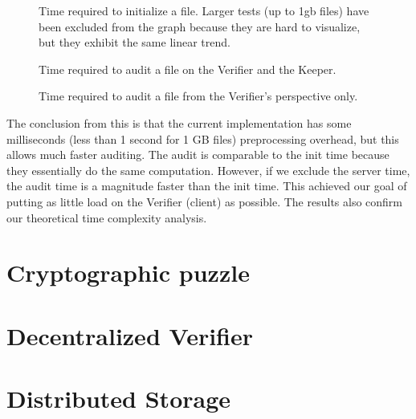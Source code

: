 \begin{figure}
  \myfloatalign
  \caption[]{Time required to initialize a file. Larger tests (up to 1gb files) have been excluded from the graph because they are hard to visualize, but they exhibit the same linear trend.}
  \label{fig:pretty-graph}
\end{figure}

\begin{figure}
  \myfloatalign
  \caption[]{Time required to audit a file on the Verifier and the Keeper.}
  \label{fig:pretty-graph}
\end{figure}

\begin{figure}
  \myfloatalign
  \caption[]{Time required to audit a file from the Verifier's perspective only.}
  \label{fig:pretty-graph}
\end{figure}

The conclusion from this is that the current implementation has some milliseconds (less than 1 second for 1 GB files) preprocessing overhead, but this allows much faster auditing.
The audit is comparable to the init time because they essentially do the same computation.
However, if we exclude the server time, the audit time is a magnitude faster than the init time.
This achieved our goal of putting as little load on the Verifier (client) as possible.
The results also confirm our theoretical time complexity analysis.

\section{Cryptographic puzzle}



\section{Decentralized Verifier}

\section{Distributed Storage}
